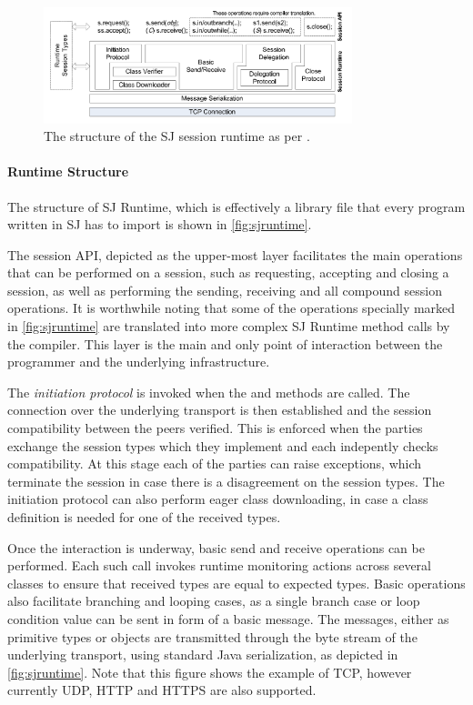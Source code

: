 \begin{figure}[htb]
\begin{center}
\includegraphics[width=0.8\textwidth]{sjruntime.png}
\caption{The structure of the SJ session runtime as per \cite{sessionbased_programming}.}
\label{fig:sjruntime}
\end{center}
\end{figure}

\paragraph*{Runtime Structure}
The structure of SJ Runtime, which is effectively a  library file that every program written in SJ has to import is shown in \autoref{fig:sjruntime}.

The session API, depicted as the upper-most layer facilitates the main operations that can be performed on a session, such as requesting, accepting and closing a session, as well as performing the sending, receiving and all compound session operations. It is worthwhile noting that some of the operations specially marked in \autoref{fig:sjruntime} are translated into more complex SJ Runtime method calls by the compiler. This layer is the main and only point of interaction between the programmer and the underlying infrastructure.

The \textit{initiation protocol} is invoked when the  and  methods are called. The connection over the underlying transport is then established and the session compatibility between the peers verified. This is enforced when the parties exchange the session types which they implement and each indepently checks compatibility. At this stage each of the parties can raise exceptions, which terminate the session in case there is a disagreement on the session types. The initiation protocol can also perform eager class downloading, in case a class definition is needed for one of the received types.

Once the interaction is underway, basic send and receive operations can be performed. Each such call invokes runtime monitoring actions across several classes to ensure that received types are equal to expected types. Basic operations also facilitate branching and looping cases, as a single branch case or loop condition value can be sent in form of a basic message. The messages, either as primitive types or objects are transmitted through the byte stream of the underlying transport, using standard Java serialization, as depicted in \autoref{fig:sjruntime}. Note that this figure shows the example of TCP, however currently UDP, HTTP and HTTPS are also supported.

